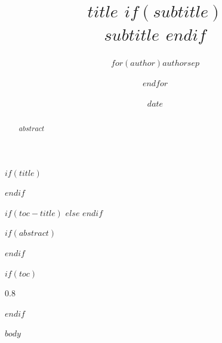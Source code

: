 \documentclass[11pt]{article}
\title{
  \vspace{-2em}
  \color{AccentPrimary}\Huge\bfseries
  $title$
  $if(subtitle)$
  \\
  \vspace{0.5em}
  \Large\color{TextSecondary}
  $subtitle$
  $endif$
}
\author{
  \large\color{TextPrimary}
  $for(author)$$author$$sep$ \and $endfor$
}
\date{\color{TextSecondary}$date$}
\date{}
\begin{document}
$if(title)$
\maketitle
\thispagestyle{fancy}
$endif$

$if(toc-title)$
  \renewcommand{\contentsname}{\color{AccentPrimary}\Large $toc-title$}
$else$
  \renewcommand{\contentsname}{\color{AccentPrimary}\Large Table des matières}
$endif$

$if(abstract)$
\begin{abstract}
$abstract$
\end{abstract}
\vspace{1em}
$endif$

\setcounter{secnumdepth}{3}

$if(toc)$
{
\hypersetup{linkcolor=AccentPrimary}
\setcounter{tocdepth}{3}
\setlength{\parskip}{0pt}
\begin{spacing}{0.8}
\tableofcontents
\end{spacing}
\vspace{1em}
}
\newpage
$endif$

$body$
\end{document}
